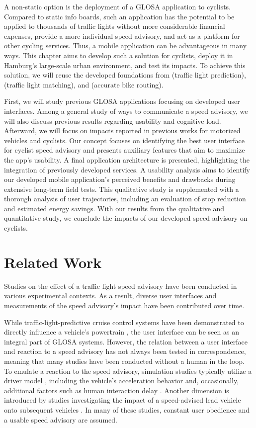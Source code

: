 A non-static option is the deployment of a GLOSA application to cyclists. Compared to static info boards, such an application has the potential to be applied to thousands of traffic lights without more considerable financial expenses, provide a more individual speed advisory, and act as a platform for other cycling services. Thus, a mobile application can be advantageous in many ways. This chapter aims to develop such a solution for cyclists, deploy it in Hamburg's large-scale urban environment, and test its impacts. To achieve this solution, we will reuse the developed foundations from  (traffic light prediction),  (traffic light matching), and  (accurate bike routing).

First, we will study previous GLOSA applications focusing on developed user interfaces. Among a general study of ways to communicate a speed advisory, we will also discuss previous results regarding usability and cognitive load. Afterward, we will focus on impacts reported in previous works for motorized vehicles and cyclists. Our concept focuses on identifying the best user interface for cyclist speed advisory and presents auxiliary features that aim to maximize the app's usability. A final application architecture is presented, highlighting the integration of previously developed services. A usability analysis aims to identify our developed mobile application's perceived benefits and drawbacks during extensive long-term field tests. This qualitative study is supplemented with a thorough analysis of user trajectories, including an evaluation of stop reduction and estimated energy savings. With our results from the qualitative and quantitative study, we conclude the impacts of our developed speed advisory on cyclists. 

\section{Related Work}

Studies on the effect of a traffic light speed advisory have been conducted in various experimental contexts. As a result, diverse user interfaces and measurements of the speed advisory's impact have been contributed over time. 

While traffic-light-predictive cruise control systems have been demonstrated to directly influence a vehicle's powertrain \cite{raubitschek_predictive_2011}, the user interface can be seen as an integral part of GLOSA systems. However, the relation between a user interface and reaction to a speed advisory has not always been tested in correspondence, meaning that many studies have been conducted without a human in the loop. To emulate a reaction to the speed advisory, simulation studies typically utilize a driver model \cite{hu_lane-level_2023}, including the vehicle's acceleration behavior and, occasionally, additional factors such as human interaction delay \cite{schlamp_2023_glosa}. Another dimension is introduced by studies investigating the impact of a speed-advised lead vehicle onto subsequent vehicles \cite{preuk_does_2016, preuk_should_2018}. In many of these studies, constant user obedience and a usable speed advisory are assumed.

